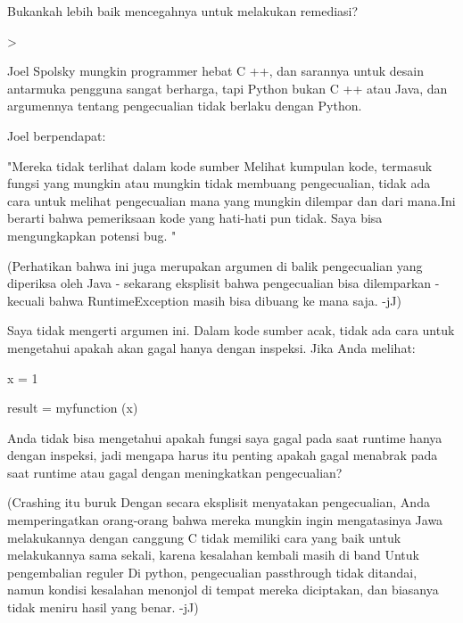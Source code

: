 \vspace{12pt}
Bukankah lebih baik mencegahnya untuk melakukan remediasi? \par
\vspace{12pt}
>  \par
\vspace{12pt}
Joel Spolsky mungkin programmer hebat C ++, dan sarannya untuk desain antarmuka pengguna sangat berharga, tapi Python bukan C ++ atau Java, dan argumennya tentang pengecualian tidak berlaku dengan Python. \par
\vspace{12pt}
Joel berpendapat: \par
\vspace{12pt}
"Mereka tidak terlihat dalam kode sumber Melihat kumpulan kode, termasuk fungsi yang mungkin atau mungkin tidak membuang pengecualian, tidak ada cara untuk melihat pengecualian mana yang mungkin dilempar dan dari mana.Ini berarti bahwa pemeriksaan kode yang hati-hati pun tidak. Saya bisa mengungkapkan potensi bug. " \par
\vspace{12pt}
(Perhatikan bahwa ini juga merupakan argumen di balik pengecualian yang diperiksa oleh Java - sekarang eksplisit bahwa pengecualian bisa dilemparkan - kecuali bahwa RuntimeException masih bisa dibuang ke mana saja. -jJ) \par
\vspace{12pt}
Saya tidak mengerti argumen ini. Dalam kode sumber acak, tidak ada cara untuk mengetahui apakah akan gagal hanya dengan inspeksi. Jika Anda melihat: \par
\vspace{12pt}
x = 1 \par
result = myfunction (x) \par
\vspace{12pt}
Anda tidak bisa mengetahui apakah fungsi saya gagal pada saat runtime hanya dengan inspeksi, jadi mengapa harus itu penting apakah gagal menabrak pada saat runtime atau gagal dengan meningkatkan pengecualian? \par
\vspace{12pt}
(Crashing itu buruk Dengan secara eksplisit menyatakan pengecualian, Anda memperingatkan orang-orang bahwa mereka mungkin ingin mengatasinya Jawa melakukannya dengan canggung C tidak memiliki cara yang baik untuk melakukannya sama sekali, karena kesalahan kembali masih di band Untuk pengembalian reguler Di python, pengecualian passthrough tidak ditandai, namun kondisi kesalahan menonjol di tempat mereka diciptakan, dan biasanya tidak meniru hasil yang benar. -jJ) \par
